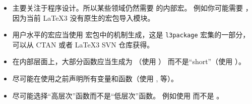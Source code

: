 \documentclass[full]{l3doc}
\begin{document}
%
\begin{itemize}
    \item {} 主要关注于程序设计。所以某些领域仍然需要 \LaTeXe{} 的内部宏。
    例如你可能需要 ，因为当前 \LaTeX3 没有原生的宏包导入模块。
    \item 用户水平的宏应当使用  宏包中的机制生成，这是 \texttt{l3package} 宏集的一部分，
    可以从 CTAN 或者 \LaTeX3 SVN 仓库获得。
   \item 在内部层面上，大部分函数应当生成为 （使用 ）
    而不是“short”（使用 ）。
    \item 尽可能在使用之前声明所有变量和函数（使用 ,  等）。
    \item 尽可能选择“高层次”函数而不是“低层次”函数。
    例如使用   而不是 。

\end{itemize}
\end{document}

